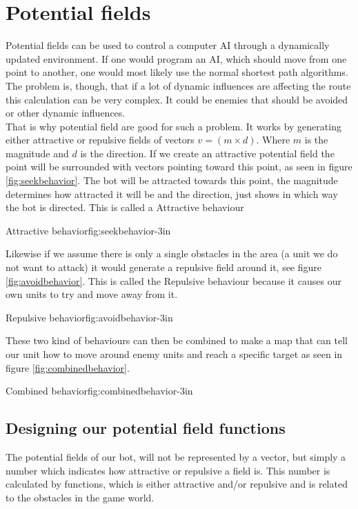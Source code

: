 \section{Potential fields}
	Potential fields can be used to control a computer AI through a dynamically updated environment. 
	If one would program an AI, which should move from one point to another, one would most likely use the normal shortest path algorithms. 
	The problem is, though, that if a lot of dynamic influences are affecting the route this calculation can be very complex. It could be 
	enemies that should be avoided or other dynamic influences. \\
	
	That is why potential field are good for such a problem. It works by generating either attractive or repulsive fields of vectors $v=(m\times d )$. 
	Where $m$ is the magnitude and $d$ is the direction. 
	If we create an attractive potential field the point will be surrounded with vectors pointing toward this point, 
	as seen in figure \ref{fig:seekbehavior}. 
	The bot will be attracted towards this point, the magnitude determines how attracted it will be and the direction, 
	just shows in which way the bot is directed. This is called a Attractive behaviour 
	
		{Attractive behavior\cite{pft}}{fig:seekbehavior}{-3in}
	
	Likewise if we assume there is only a single obstacles in the area (a unit we do not want to attack) it would generate a repulsive field around it, 
	see figure \ref{fig:avoidbehavior}. This is called the Repulsive behaviour because it causes our own units to try and move away from it.

		{Repulsive behavior\cite{pft}}{fig:avoidbehavior}{-3in}
		
	These two kind of behaviours can then be combined to make a map that can tell our unit 
	how to move around enemy units and reach a specific target as seen in figure \ref{fig:combinedbehavior}.
	
		{Combined behavior\cite{pft}}{fig:combinedbehavior}{-3in}
		
	\subsection{Designing our potential field functions}		
		The potential fields of our bot, will not be represented by a vector, but simply a number which indicates how attractive or repulsive a field is. 
		This number is calculated by functions, which is either attractive and/or repulsive and is related to the obstacles in the game world. \\
		
